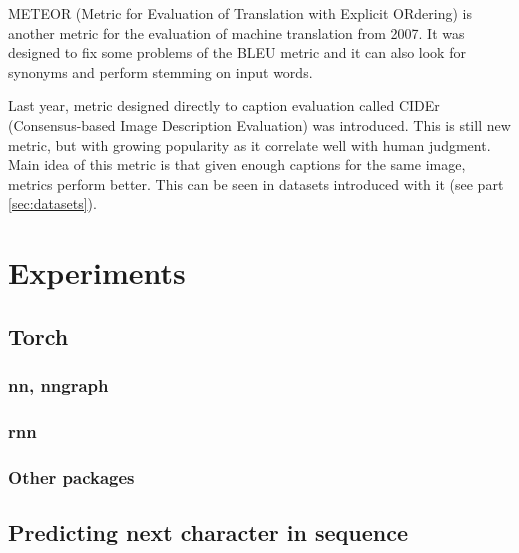 METEOR (Metric for Evaluation of Translation with Explicit ORdering) \cite{Lavie:2007:MAM:1626355.1626389} is another metric for the evaluation of machine translation from 2007. It was designed to fix some problems of the BLEU metric and it can also look for synonyms and perform stemming on input words.
		
Last year, metric designed directly to caption evaluation called CIDEr (Consensus-based Image Description Evaluation) \cite{Vedantam_2015_CVPR} was introduced. This is still new metric, but with growing popularity as it correlate well with human judgment. Main idea of this metric is that given enough captions for the same image, metrics perform better. This can be seen in datasets introduced with it (see part \ref{sec:datasets}).		

\chapter{Experiments}

\section{Torch}

\subsection{nn, nngraph}

\subsection{rnn}

\subsection{Other packages}

\section{Predicting next character in sequence}
\cite{char-rnn}

